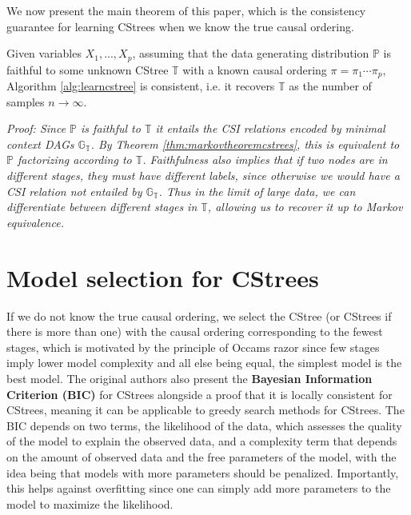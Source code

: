 \documentclass{tufte-book}
\begin{document}
We now present the main theorem of this paper, which is the consistency guarantee for learning CStrees when we know the true causal ordering.


\begin{theorem}\label{thm:cstreepccorrectness}
Given variables $X_1,...,X_p$, assuming that the data generating distribution $\mathbb{P}$ is faithful to some unknown CStree $\mathbb{T}$ with a known causal ordering $\pi = \pi_1 \cdots \pi_p$, Algorithm \ref{alg:learncstree} is consistent, i.e. it recovers $\mathbb{T}$ as the number of samples $n \rightarrow \infty$.
\end{theorem}


\textit{Proof:
Since $\mathbb{P}$ is faithful to $\mathbb{T}$ it entails the CSI relations encoded by minimal context DAGs $\mathbb{G}_{\mathbb{T}}$. By Theorem \ref{thm:markovtheoremcstrees}, this is equivalent to $\mathbb{P}$ factorizing according to $\mathbb{T}$. Faithfulness also implies that if two nodes are in different stages, they must have different labels, since otherwise we would have a CSI relation not entailed by $\mathbb{G}_{\mathbb{T}}$. Thus in the limit of large data, we can differentiate between different stages in $\mathbb{T}$, allowing us to recover it up to Markov equivalence.
}

\section{Model selection for CStrees}
\label{sec:orgec530fb}
If we do not know the true causal ordering, we select the CStree (or CStrees if there is more than one) with the causal ordering corresponding to the fewest stages, which is motivated by the principle of Occams razor \cite{pearl-2009-causal} since few stages imply lower model complexity and all else being equal, the simplest model is the best model. The original authors also present the \textbf{Bayesian Information Criterion (BIC)} for CStrees alongside a proof that it is locally consistent for CStrees, meaning it can be applicable to greedy search methods for CStrees. The BIC depends on two terms, the likelihood of the data, which assesses the quality of the model to explain the observed data, and a complexity term that depends on the amount of observed data and the free parameters of the model, with the idea being that models with more parameters should be penalized. Importantly, this helps against overfitting since one can simply add more parameters to the model to maximize the likelihood.
\end{document}

